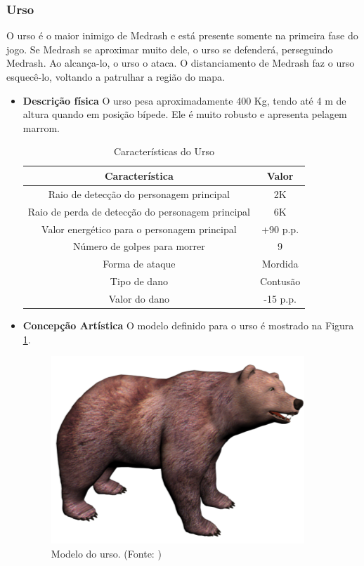 \subsubsection{Urso}
O urso é o maior inimigo de Medrash e está presente somente na primeira
 fase do jogo. Se Medrash se aproximar muito dele, o urso se defenderá,
 perseguindo Medrash. Ao alcança-lo, o urso o ataca. O distanciamento de
 Medrash faz o urso esquecê-lo, voltando a patrulhar a região do mapa.
\begin{itemize}
\item {\bf Descrição física}
O urso pesa aproximadamente 400 Kg, tendo até 4 m de altura quando em
 posição bípede. Ele é muito robusto e apresenta pelagem marrom.


\begin{table}[H]
\begin{center}
\begin{tabular}{|c|c|}
\hline 
\textbf{Característica} & \textbf{Valor} \\ 
\hline 
Raio de detecção do personagem principal & 2K \\ 
\hline 
Raio de perda de detecção do personagem principal & 6K \\ 
\hline 
Valor energético para o personagem principal & +90 p.p. \\ 
\hline 
Número de golpes para morrer & 9 \\ 
\hline 
Forma de ataque & Mordida \\ 
\hline 
Tipo de dano & Contusão \\ 
\hline 
Valor do dano & -15 p.p. \\ 
\hline 
\end{tabular} 
\caption{Características do Urso}
\end{center}
\end{table}


\item {\bf Concepção Artística}
O modelo definido para o urso é mostrado na Figura \ref{img:urso}.

\begin{figure}[H]
 \centering
 \includegraphics[scale=0.8]{Imagens/urso01.png}
 \caption{Modelo do urso. (Fonte: \cite{bib:urso01})}
\label{img:urso}
\end{figure}


\end{itemize}
